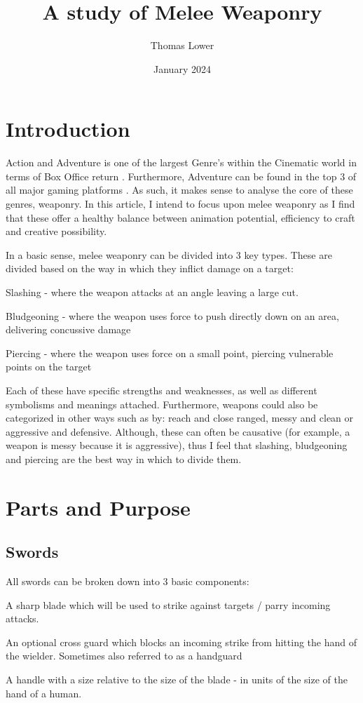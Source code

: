 \documentclass{article}
\title{A study of Melee Weaponry}
\author{Thomas Lower}
\date{January 2024}
\begin{document}
\maketitle

\pagebreak

\tableofcontents

\pagebreak

\section{Introduction}
Action and Adventure is one of the largest Genre's within the Cinematic world in terms of Box Office return \parencite{1}. Furthermore, Adventure can be found in the top 3 of all major gaming platforms \parencite{2}. As such, it makes sense to analyse the core of these genres, weaponry. In this article, I intend to focus upon melee weaponry as I find that these offer a healthy balance between animation potential, efficiency to craft and creative possibility.


In a basic sense, melee weaponry can be divided into 3 key types. These are divided based on the way in which they inflict damage on a target:
\begin{list}{-}{}
    \item Slashing - where the weapon attacks at an angle leaving a large cut.
    \item Bludgeoning - where the weapon uses force to push directly down on an area, delivering concussive damage
    \item Piercing - where the weapon uses force on a small point, piercing vulnerable points on the target
\end{list}
\parencite{bozkir2024just}

Each of these have specific strengths and weaknesses, as well as different symbolisms and meanings attached. Furthermore, weapons could also be categorized in other ways such as by: reach and close ranged, messy and clean or aggressive and defensive. Although, these can often be causative (for example, a weapon is messy because it is aggressive), thus I feel that slashing, bludgeoning and piercing are the best way in which to divide them.

\pagebreak
\section{Parts and Purpose}
\subsection{Swords}
All swords can be broken down into 3 basic components:\begin{list}{-}{-}
    \item A sharp blade which will be used to strike against targets / parry incoming attacks.
    \item An optional cross guard which blocks an incoming strike from hitting the hand of the wielder. Sometimes also referred to as a handguard
    \item A handle with a size relative to the size of the blade - in units of the size of the hand of a human.
\end{list}
\end{document}
